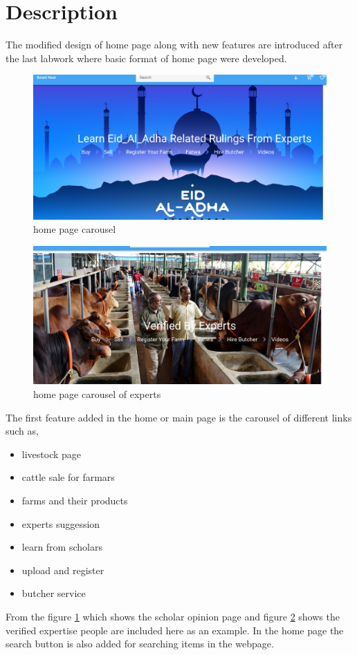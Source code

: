 \documentclass[a4paper,12pt]{report}
\begin{document}
\section*{Description}
The modified design of home page along with new features are introduced after the last labwork where basic format of home page were developed.
\begin{figure}[H]
	\includegraphics[keepaspectratio, width=\linewidth ]{coursel1.png}
	\caption{home page carousel}
	\label{coursel1}
\end{figure}
\begin{figure}[]
	\includegraphics[keepaspectratio, width=\linewidth ]{coursel2.png}
	\caption{home page carousel of experts}
	\label{coursel2}
\end{figure}
The first feature added in the home or main page is the carousel of different links such as,
\begin{itemize}
	\item livestock page
	\item cattle sale for farmars
	\item farms and their products
	\item experts suggession
	\item learn from scholars
	\item upload and register
	\item butcher service
\end{itemize}
From the figure \ref{coursel1} which shows the scholar opinion page and figure \ref{coursel2} shows the verified expertise people are included here as an example.
In the home page the search button is also added for searching items in the webpage.
\end{document}
